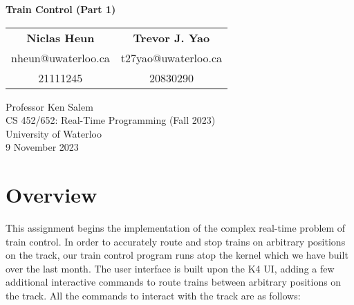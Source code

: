\documentclass[12pt, titlepage]{article}
\begin{document}
    \begin{titlepage}
        \begin{center}
            \vspace*{5em}
            \textbf{\LARGE Train Control (Part 1)}
            \vspace*{3em}

            \begin{tabular}{c@{\hskip 8em}c}
                \textbf{\large Niclas Heun} & \textbf{\large Trevor J. Yao} \\
                {\small nheun@uwaterloo.ca} & {\small t27yao@uwaterloo.ca} \\
                {\footnotesize 21111245} & {\footnotesize 20830290} \\
            \end{tabular}

            \vfill

            Professor Ken Salem \\
            CS 452/652: Real-Time Programming (Fall 2023) \\
            University of Waterloo \\
            9 November 2023

            \vspace*{5em}

        \end{center}
    \end{titlepage}


    \pagestyle{fancy}

    \tableofcontents
    \listoffigures
    \pagebreak

    \section{Overview}
    \label{sec:overview}

    This assignment begins the implementation of the complex real-time problem of train control. In order to accurately route and stop trains on arbitrary positions on the track, our train control program runs atop the kernel which we have built over the last month. The user interface is built upon the K4 UI, adding a few additional interactive commands to route trains between arbitrary positions on the track. All the commands to interact with the track are as follows:
\end{document}
